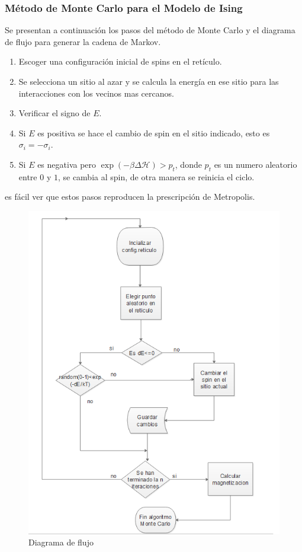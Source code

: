\documentclass[a4paper]{article}
\begin{document}
\subsubsection{Método de Monte Carlo para el Modelo de Ising}
Se presentan a continuación los pasos del método de Monte Carlo y el diagrama de flujo para generar la cadena de Markov.
\begin{enumerate}
\item Escoger una configuración inicial de spins en el retículo.
\item Se selecciona un sitio al azar y se calcula la energía en ese sitio para las interacciones con los vecinos mas cercanos. 
\item Verificar el signo de $E$.
\item Si $E$ es positiva se hace el cambio de spin en el sitio indicado, esto es $\sigma_i=-\sigma_i$.
\item Si $E$ es negativa pero $\exp(-\beta \Delta \mathcal{H})>p_t$, donde $p_t$ es un numero aleatorio entre $0$ y $1$, se cambia al spin, de otra manera se reinicia el ciclo.
\end{enumerate}
es fácil ver que estos pasos reproducen la prescripción de Metropolis.
\pagebreak
\begin{figure}[H]
\begin{center}
\includegraphics[scale=0.9]{FluxDiagram.png} 
\end{center} 
\caption{Diagrama de flujo}
\end{figure}
\end{document}

